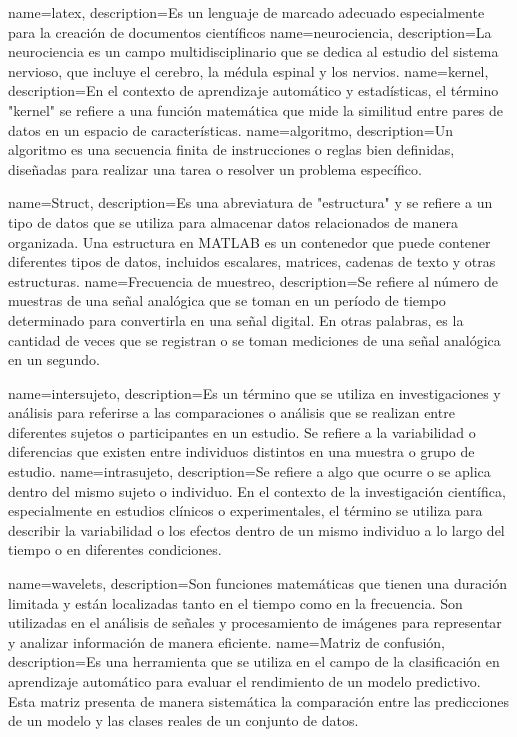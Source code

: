 {
    name=latex,
    description={Es un lenguaje de marcado adecuado especialmente para la creación de documentos científicos}
} 
{
    name=neurociencia,
    description={La neurociencia es un campo multidisciplinario que se dedica al estudio del sistema nervioso, que incluye el cerebro, la médula espinal y los nervios.}
}  
{
    name=kernel,
    description={En el contexto de aprendizaje automático y estadísticas, el término "kernel" se refiere a una función matemática que mide la similitud entre pares de datos en un espacio de características.} 
}
{
	name=algoritmo,
	description={Un algoritmo es una secuencia finita de instrucciones o reglas bien definidas, diseñadas para realizar una tarea o resolver un problema específico.} 
}

{
	name=Struct,
	description={Es una abreviatura de "estructura" y se refiere a un tipo de datos que se utiliza para almacenar datos relacionados de manera organizada. Una estructura en MATLAB es un contenedor que puede contener diferentes tipos de datos, incluidos escalares, matrices, cadenas de texto y otras estructuras.} 
}
{
	name=Frecuencia de muestreo,
	description={Se refiere al número de muestras de una señal analógica que se toman en un período de tiempo determinado para convertirla en una señal digital. En otras palabras, es la cantidad de veces que se registran o se toman mediciones de una señal analógica en un segundo.} 
}

{
	name=intersujeto,
	description={Es un término que se utiliza en investigaciones y análisis para referirse a las comparaciones o análisis que se realizan entre diferentes sujetos o participantes en un estudio. Se refiere a la variabilidad o diferencias que existen entre individuos distintos en una muestra o grupo de estudio.} 
}
{
	name=intrasujeto,
	description={Se refiere a algo que ocurre o se aplica dentro del mismo sujeto o individuo. En el contexto de la investigación científica, especialmente en estudios clínicos o experimentales, el término se utiliza para describir la variabilidad o los efectos dentro de un mismo individuo a lo largo del tiempo o en diferentes condiciones.} 
}

{
	name=wavelets,
	description={Son funciones matemáticas que tienen una duración limitada y están localizadas tanto en el tiempo como en la frecuencia. Son utilizadas en el análisis de señales y procesamiento de imágenes para representar y analizar información de manera eficiente.} 
}
{
	name=Matriz de confusión,
	description={Es una herramienta que se utiliza en el campo de la clasificación en aprendizaje automático para evaluar el rendimiento de un modelo predictivo. Esta matriz presenta de manera sistemática la comparación entre las predicciones de un modelo y las clases reales de un conjunto de datos.} 
}

